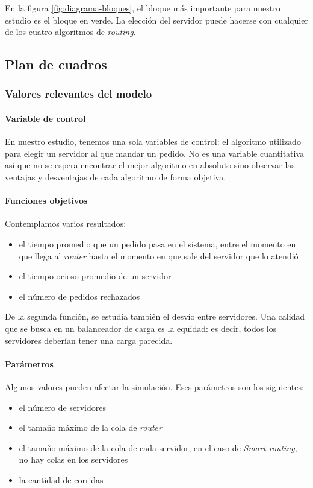 En la figura \ref{fig:diagrama-bloques}, el bloque más importante para nuestro estudio es el bloque en verde. La
elección del servidor puede hacerse con cualquier de los cuatro algoritmos de \textit{routing}.


\subsection{Plan de cuadros}

\subsubsection{Valores relevantes del modelo}

\paragraph{Variable de control}
En nuestro estudio, tenemos una sola variables de control: el algoritmo utilizado para elegir un servidor al que mandar
un pedido. No es una variable cuantitativa así que no se espera encontrar el mejor algoritmo en absoluto sino observar
las ventajas y desventajas de cada algoritmo de forma objetiva.

\paragraph{Funciones objetivos}
Contemplamos varios resultados:
\begin{itemize}
    \item el tiempo promedio que un pedido pasa en el sistema, entre el momento en que llega al \textit{router} hasta el
	momento en que sale del servidor que lo atendió
    \item el tiempo ocioso promedio de un servidor
    \item el número de pedidos rechazados
\end{itemize}
De la segunda función, se estudia también el desvío entre servidores. Una calidad que se busca en un balanceador de
carga es la equidad: es decir, todos los servidores deberían tener una carga parecida.


\paragraph{Parámetros}
Algunos valores pueden afectar la simulación. Eses parámetros son los siguientes:
\begin{itemize}
    \item el número de servidores
    \item el tamaño máximo de la cola de \textit{router}
    \item el tamaño máximo de la cola de cada servidor, en el caso de \textit{Smart routing}, no hay colas en los servidores
    \item la cantidad de corridas
\end{itemize}


